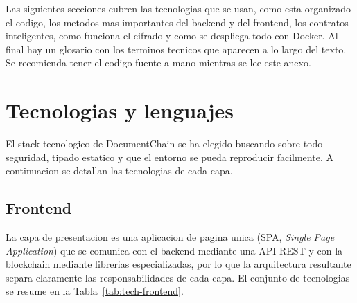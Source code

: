 \documentclass[11pt, a4paper]{article}
\begin{document}
Las siguientes secciones cubren las tecnologias que se usan, como esta organizado el codigo, los metodos mas importantes del backend y del frontend, los contratos inteligentes, como funciona el cifrado y como se despliega todo con Docker. Al final hay un glosario con los terminos tecnicos que aparecen a lo largo del texto. Se recomienda tener el codigo fuente a mano mientras se lee este anexo.

\section{Tecnologias y lenguajes}

El stack tecnologico de DocumentChain se ha elegido buscando sobre todo seguridad, tipado estatico y que el entorno se pueda reproducir facilmente. A continuacion se detallan las tecnologias de cada capa.

\subsection{Frontend}

La capa de presentacion es una aplicacion de pagina unica (SPA, \textit{Single Page Application}) que se comunica con el backend mediante una API REST y con la blockchain mediante librerias especializadas, por lo que la arquitectura resultante separa claramente las responsabilidades de cada capa. El conjunto de tecnologias se resume en la Tabla~\ref{tab:tech-frontend}.
\end{document}
